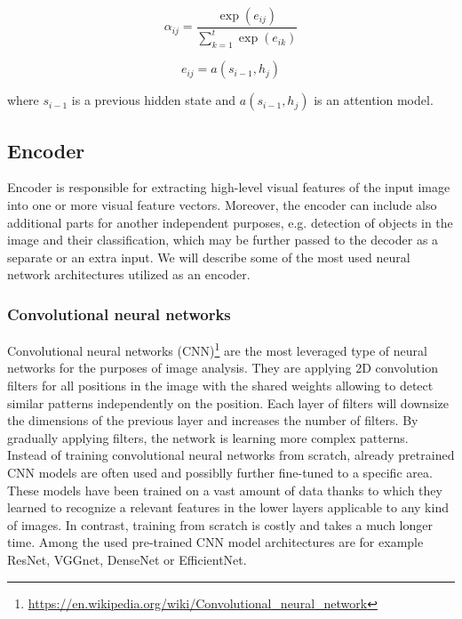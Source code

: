 \begin{equation}\label{eq01:AttWeights}
	\alpha_{ij} = \frac{\exp(e_{ij})}{\sum_{k=1}^{t} \exp(e_{ik})}
\end{equation}

\begin{equation}\label{eq01:AttFeedForwardNetwork}
	e_{ij} = a(s_{i-1}, h_j)
\end{equation}

where $s_{i-1}$ is a previous hidden state and $a(s_{i-1}, h_j)$ is an attention model.

\subsection{Encoder}
Encoder is responsible for extracting high-level visual features of the input image into one or more visual feature vectors. Moreover, the encoder can include also additional parts for another independent purposes, e.g. detection of objects in the image and their classification, which may be further passed to the decoder as a separate or an extra input. We will describe some of the most used neural network architectures utilized as an encoder.

\subsubsection{Convolutional neural networks}
Convolutional neural networks (CNN)\footnote[1]{\url{https://en.wikipedia.org/wiki/Convolutional\_neural\_network}} are the most leveraged type of neural networks for the purposes of image analysis. They are applying 2D convolution filters for all positions in the image with the shared weights allowing to detect similar patterns independently on the position. Each layer of filters will downsize the dimensions of the previous layer and increases the number of filters. By gradually applying filters, the network is learning more complex patterns.\\

Instead of training convolutional neural networks from scratch, already pretrained CNN models are often used and possiblly further fine-tuned to a specific area. These models have been trained on a vast amount of data thanks to which they learned to recognize a relevant features in the lower layers applicable to any kind of images. In contrast, training from scratch is costly and takes a much longer time. Among the used pre-trained CNN model architectures are for example ResNet\citep{he2016deep}, VGGnet\citep{simonyan2014very}, DenseNet\citep{huang2017densely} or EfficientNet\citep{tan2019efficientnet}.

